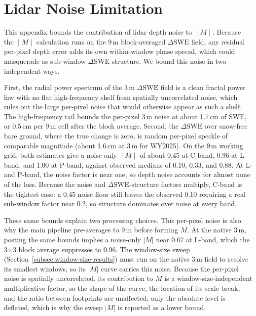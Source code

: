 \documentclass[tc, manuscript]{copernicus}
\begin{document}




\appendix
\section{Lidar Noise Limitation}\label{appendix:noise}    %

This appendix bounds the contribution of lidar depth noise to $∣M∣$. Because the $∣M∣$ calculation runs on the 9\,\unit{m} block-averaged $\Delta\mathrm{SWE}$ field, any residual per-pixel depth error adds its own within-window phase spread, which could masquerade as sub-window $\Delta\mathrm{SWE}$ structure. We bound this noise in two independent ways.

First, the radial power spectrum of the 3\,\unit{m} $\Delta\mathrm{SWE}$ field is a clean fractal power law with no flat high-frequency shelf from spatially uncorrelated noise, which rules out the large per-pixel noise that would otherwise appear as such a shelf. The high-frequency tail bounds the per-pixel 3\,\unit{m} noise at about 1.7\,\unit{cm} of SWE, or 0.5\,\unit{cm} per 9\,\unit{m} cell after the block average. Second, the $\Delta\mathrm{SWE}$ over snow-free bare ground, where the true change is zero, is random per-pixel speckle of comparable magnitude (about 1.6\,\unit{cm} at 3\,\unit{m} for WY2025). On the 9\,\unit{m} working grid, both estimates give a noise-only $∣M∣$ of about 0.45 at C-band, 0.96 at L-band, and 1.00 at P-band, against observed medians of 0.10, 0.33, and 0.88. At L- and P-band, the noise factor is near one, so depth noise accounts for almost none of the loss. Because the noise and $\Delta\mathrm{SWE}$-structure factors multiply, C-band is the tightest case: a 0.45 noise floor still leaves the observed 0.10 requiring a real sub-window factor near 0.2, so structure dominates over noise at every band.

These same bounds explain two processing choices. This per-pixel noise is also why the main pipeline pre-averages to 9\,\unit{m} before forming $M$. At the native 3\,\unit{m}, posting the same bounds implies a noise-only $|M|$ near 0.67 at L-band, which the 3$\times$3 block average suppresses to 0.96. The window-size sweep (Section~\ref{subsec:window-size-results}) must run on the native 3\,\unit{m} field to resolve its smallest windows, so its $|M|$ curve carries this noise. Because the per-pixel noise is spatially uncorrelated, its contribution to $M$ is a window-size-independent multiplicative factor, so the shape of the curve, the location of its scale break, and the ratio between footprints are unaffected; only the absolute level is deflated, which is why the sweep $|M|$ is reported as a lower bound.
\end{document}
